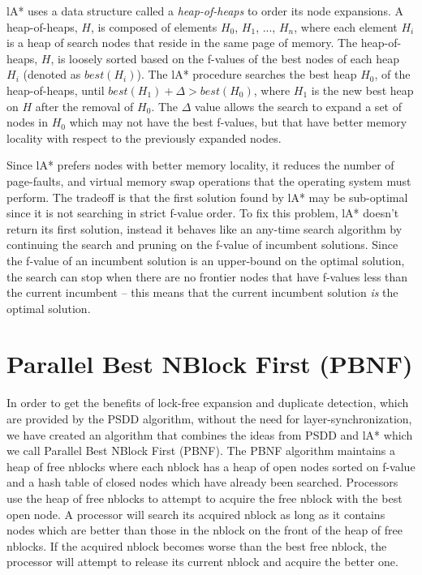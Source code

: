 \documentclass{article}
\begin{document}
lA* uses a data structure called a \emph{heap-of-heaps} to order its
node expansions.  A heap-of-heaps, $H$, is composed of elements $H_0$,
$H_1$, ..., $H_n$, where each element $H_i$ is a heap of search nodes
that reside in the same page of memory.  The heap-of-heaps, $H$, is
loosely sorted based on the f-values of the best nodes of each heap
$H_i$ (denoted as $best(H_i)$).  The lA* procedure searches the best
heap $H_0$, of the heap-of-heaps, until $best(H_1) + \Delta >
best(H_0)$, where $H_1$ is the new best heap on $H$ after the removal
of $H_0$.  The $\Delta$ value allows the search to expand a set of
nodes in $H_0$ which may not have the best f-values, but that have
better memory locality with respect to the previously expanded nodes.

Since lA* prefers nodes with better memory locality, it reduces the
number of page-faults, and virtual memory swap operations that the
operating system must perform.  The tradeoff is that the first
solution found by lA* may be sub-optimal since it is not searching in
strict f-value order.  To fix this problem, lA* doesn't return its
first solution, instead it behaves like an any-time search algorithm
by continuing the search and pruning on the f-value of incumbent
solutions.  Since the f-value of an incumbent solution is an
upper-bound on the optimal solution, the search can stop when there
are no frontier nodes that have f-values less than the current
incumbent -- this means that the current incumbent solution \emph{is}
the optimal solution.

\section{Parallel Best NBlock First (PBNF)}

In order to get the benefits of lock-free expansion and duplicate
detection, which are provided by the PSDD algorithm, without the need
for layer-synchronization, we have created an algorithm that combines
the ideas from PSDD and lA* which we call Parallel Best NBlock First
(PBNF).  The PBNF algorithm maintains a heap of free nblocks where
each nblock has a heap of open nodes sorted on f-value and a hash
table of closed nodes which have already been searched.  Processors
use the heap of free nblocks to attempt to acquire the free nblock
with the best open node.  A processor will search its acquired nblock
as long as it contains nodes which are better than those in the nblock
on the front of the heap of free nblocks.  If the acquired nblock
becomes worse than the best free nblock, the processor will attempt to
release its current nblock and acquire the better one.
\end{document}
